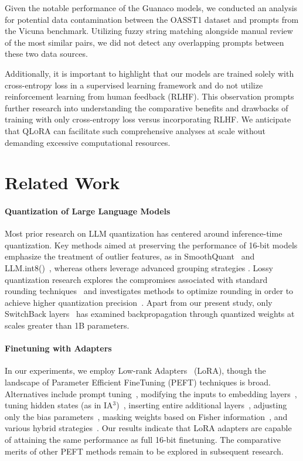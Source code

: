 Given the notable performance of the {Guanaco} models, we conducted an analysis for potential data contamination between the OASST1 dataset and prompts from the Vicuna benchmark. Utilizing fuzzy string matching alongside manual review of the most similar pairs, we did not detect any overlapping prompts between these two data sources.

Additionally, it is important to highlight that our models are trained solely with cross-entropy loss in a supervised learning framework and do not utilize reinforcement learning from human feedback (RLHF). This observation prompts further research into understanding the comparative benefits and drawbacks of training with only cross-entropy loss versus incorporating RLHF. We anticipate that \textsc{QLoRA} can facilitate such comprehensive analyses at scale without demanding excessive computational resources.

\section{Related Work}

\paragraph{Quantization of Large Language Models} Most prior research on LLM quantization has centered around inference-time quantization. Key methods aimed at preserving the performance of 16-bit models emphasize the treatment of outlier features, as in SmoothQuant~\citep{xiao2022smoothquant} and LLM.int8()~\citep{dettmers2022llm}, whereas others leverage advanced grouping strategies \citep{park2022nuqmm, yao2022zeroquant}. Lossy quantization research explores the compromises associated with standard rounding techniques~\citep{dettmers2022case,zeng2022glm,pope2022efficiently} and investigates methods to optimize rounding in order to achieve higher quantization precision~\citep{frantar2022gptq}. Apart from our present study, only SwitchBack layers~\citep{wortsman2023stable} has examined backpropagation through quantized weights at scales greater than 1B parameters.

\paragraph{Finetuning with Adapters} In our experiments, we employ Low-rank Adapters~\citep{hu2021lora} (LoRA), though the landscape of Parameter Efficient FineTuning (PEFT) techniques is broad. Alternatives include prompt tuning~\citep{qin2021learning,lester2021power,li2021prefix}, modifying the inputs to embedding layers~\citep{an2022input}, tuning hidden states (as in IA$^3$)~\citep{liu2022few}, inserting entire additional layers~\citep{houlsby2019parameter}, adjusting only the bias parameters~\citep{zaken2021bitfit}, masking weights based on Fisher information~\citep{sung2021training}, and various hybrid strategies~\citep{henderson2021compacter}. Our results indicate that LoRA adapters are capable of attaining the same performance as full 16-bit finetuning. The comparative merits of other PEFT methods remain to be explored in subsequent research.

